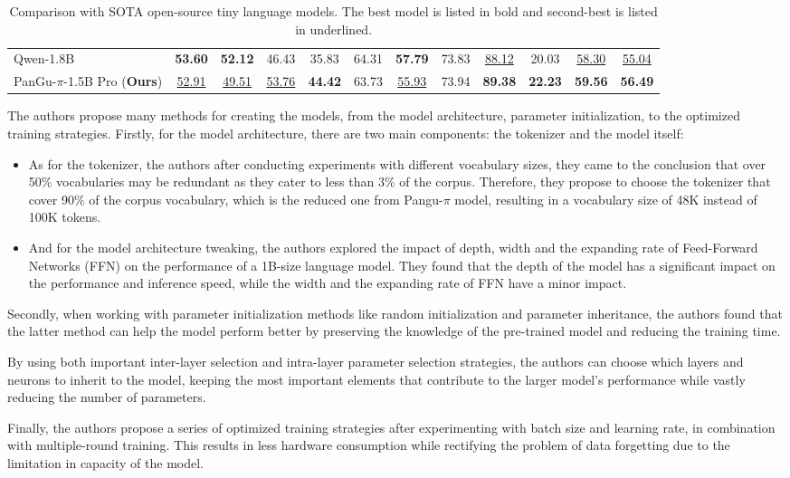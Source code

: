 \begin{table}
{\begin{tabular}{lccccccccccc}
      Qwen-1.8B & \textbf{53.60} & \textbf{52.12} & 46.43  & {35.83}  & 64.31  & \textbf{57.79} & 73.83  & \underline{88.12}  & 20.03  & \underline{58.30}  & \underline{55.04}  \\
      PanGu-$\pi$-1.5B Pro (\textbf{Ours}) & \underline{52.91}  & \underline{49.51}  & \underline{53.76}  & \textbf{44.42}  & 63.73 & \underline{55.93}  & 73.94  & \textbf{89.38} & \textbf{22.23} & \textbf{59.56} & \textbf{56.49}  \\
      \bottomrule
      \end{tabular}%
      }
      \caption{Comparison with SOTA open-source tiny language models. The best model is listed in bold and second-best is listed in underlined.}
      \label{tab:pangu_benchmark}%
  \end{table}%
The authors propose many methods for creating the models, from the model architecture, parameter initialization, to the optimized training strategies. Firstly, for the model architecture, there are two main components: the tokenizer and the model itself:
\begin{itemize}
    \item As for the tokenizer, the authors after conducting experiments with different vocabulary sizes, they came to the conclusion that over 50\% vocabularies may be redundant as they cater to less than 3\% of the corpus. Therefore, they propose to choose the tokenizer that cover 90\% of the corpus vocabulary, which is the reduced one from Pangu-$\pi$ model, resulting in a vocabulary size of 48K instead of 100K tokens. 
    \item And for the model architecture tweaking, the authors explored the impact of depth, width and the expanding rate of Feed-Forward Networks (FFN) on the performance of a 1B-size language model. They found that the depth of the model has a significant impact on the performance and inference speed, while the width and the expanding rate of FFN have a minor impact.

\end{itemize}
Secondly, when working with parameter initialization methods like random initialization and parameter inheritance, the authors found that the latter method can help the model perform better by preserving the knowledge of the pre-trained model and reducing the training time. \par
By using both important inter-layer selection and intra-layer parameter selection strategies, the authors can choose which layers and neurons to inherit to the model, keeping the most important elements that contribute to the larger model's performance while vastly reducing the number of parameters. \par
Finally, the authors propose a series of optimized training strategies after experimenting with batch size and learning rate, in combination with multiple-round training. This results in less hardware consumption while rectifying the problem of data forgetting due to the limitation in capacity of the model. \par
